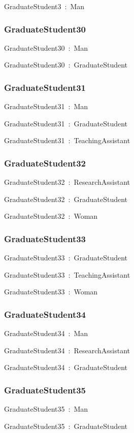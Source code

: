 \documentclass{article}
\begin{document}
GraduateStudent3~:~Man

\subsubsection*{GraduateStudent30}

GraduateStudent30~:~Man

GraduateStudent30~:~GraduateStudent

\subsubsection*{GraduateStudent31}

GraduateStudent31~:~Man

GraduateStudent31~:~GraduateStudent

GraduateStudent31~:~TeachingAssistant

\subsubsection*{GraduateStudent32}

GraduateStudent32~:~ResearchAssistant

GraduateStudent32~:~GraduateStudent

GraduateStudent32~:~Woman

\subsubsection*{GraduateStudent33}

GraduateStudent33~:~GraduateStudent

GraduateStudent33~:~TeachingAssistant

GraduateStudent33~:~Woman

\subsubsection*{GraduateStudent34}

GraduateStudent34~:~Man

GraduateStudent34~:~ResearchAssistant

GraduateStudent34~:~GraduateStudent

\subsubsection*{GraduateStudent35}

GraduateStudent35~:~Man

GraduateStudent35~:~GraduateStudent
\end{document}
